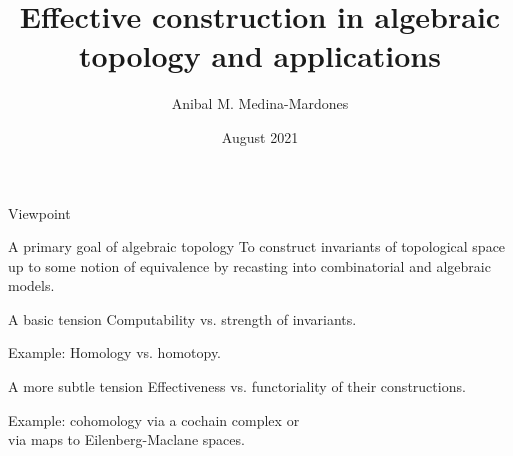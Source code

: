 \documentclass[10pt,t]{beamer} %
\title[clesto]{Effective construction in algebraic topology and applications}
\author[ammedmar]{Anibal M. Medina-Mardones}
\institute{Max Planck Institute for Mathematics in Bonn}
\date{August 2021}
\begin{document}
{


\begin{frame}
    \titlepage
\end{frame}
}

\begin{frame}{Viewpoint}
	\vskip -10pt
	\begin{block}{A primary goal of algebraic topology}
		To construct invariants of topological space up to some notion of equivalence by recasting into combinatorial and algebraic models.
	\end{block}

	\medskip \pause
	\begin{block}{A basic tension}
		Computability vs. strength of invariants.
	\end{block}

	\medskip \textcolor{pblue}{Example:}
	Homology vs. homotopy.

	\medskip \pause
	\begin{block}{A more subtle tension}
		Effectiveness vs. functoriality of their constructions.
	\end{block}

	\medskip \textcolor{pblue}{Example:}
	cohomology via a cochain complex or \\
	\hspace*{40pt} via maps to Eilenberg-Maclane spaces.
\end{frame}
\end{document}
